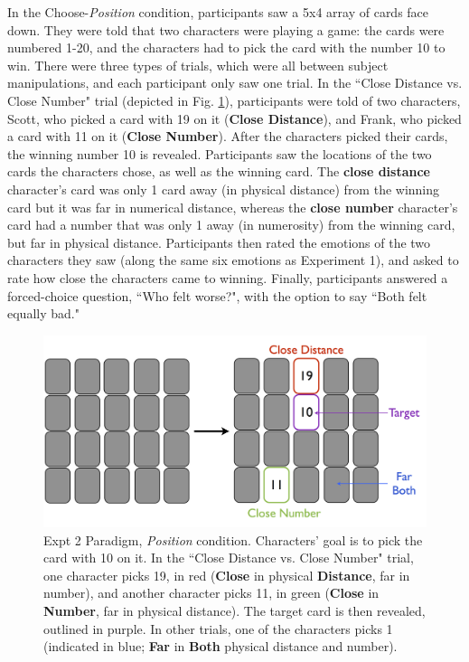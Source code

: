 \documentclass[10pt,letterpaper]{article}
\begin{document}
	In the Choose-\textit{Position} condition, participants saw a 5x4 array of cards face down. They were told that two characters were playing a game: the cards were numbered 1-20, and the characters had to pick the card with the number 10 to win. There were three types of trials, which were all between subject manipulations, and each participant only saw one trial. In the ``Close Distance vs. Close Number" trial (depicted in Fig. \ref{Expt2ParadigmFig}), participants were told of two characters, Scott, who picked a card with 19 on it (\textbf{Close Distance}), and Frank, who picked a card with 11 on it (\textbf{Close Number}). After the characters picked their cards, the winning number 10 is revealed. Participants saw the locations of the two cards the characters chose, as well as the winning card. The \textbf{close distance} character's card was only 1 card away (in physical distance) from the winning card but it was far in numerical distance, whereas the \textbf{close number} character's card had a number that was only 1 away (in numerosity) from the winning card, but far in physical distance. Participants then rated the emotions of the two characters they saw (along the same six emotions as Experiment 1), and asked to rate how close the characters came to winning. Finally, participants answered a forced-choice question, ``Who felt worse?", with the option to say ``Both felt equally bad."

\begin{figure}[htb!]
\includegraphics[width=\columnwidth]{images/card_paradigm.png}
\caption{ Expt 2 Paradigm, \textit{Position} condition. Characters' goal is to pick the card with 10 on it. In the ``Close Distance vs. Close Number" trial, one character picks 19, in red (\textbf{Close} in physical \textbf{Distance}, far in number), and another character picks 11, in green (\textbf{Close} in \textbf{Number}, far in physical distance). The target card is then revealed, outlined in purple. In other trials, one of the characters picks 1 (indicated in blue; \textbf{Far} in \textbf{Both} physical distance and number). }
\label{Expt2ParadigmFig}
\end{figure}
\end{document}
